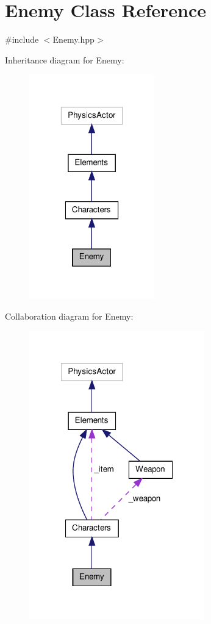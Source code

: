 \hypertarget{class_enemy}{\section{Enemy Class Reference}
\label{class_enemy}
}


{\ttfamily \#include $<$Enemy.\-hpp$>$}



Inheritance diagram for Enemy\-:\nopagebreak
\begin{figure}[H]
\begin{center}
\leavevmode
\includegraphics[width=154pt]{class_enemy__inherit__graph}
\end{center}
\end{figure}


Collaboration diagram for Enemy\-:\nopagebreak
\begin{figure}[H]
\begin{center}
\leavevmode
\includegraphics[width=215pt]{class_enemy__coll__graph}
\end{center}
\end{figure}
